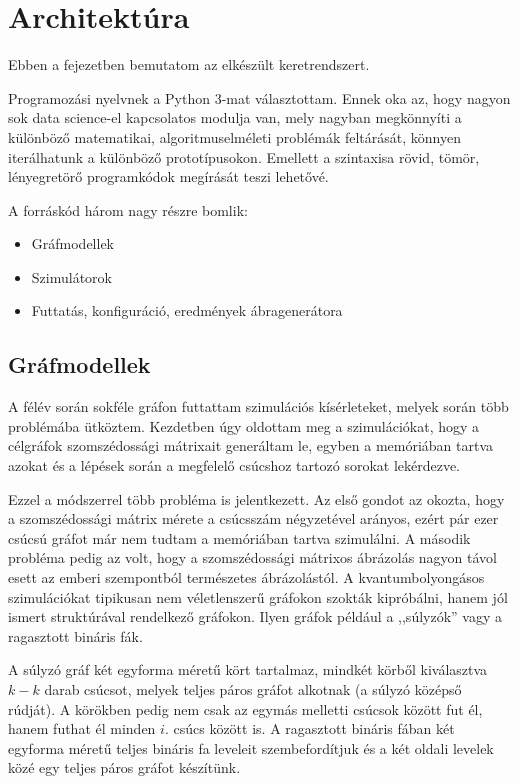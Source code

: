 \chapter{Architektúra}

Ebben a fejezetben bemutatom az elkészült keretrendszert.

Programozási nyelvnek a Python 3-mat választottam. Ennek oka az, hogy nagyon
sok data science-el kapcsolatos modulja van, mely nagyban megkönnyíti a
különböző matematikai, algoritmuselméleti problémák feltárását, könnyen
iterálhatunk a különböző prototípusokon. Emellett a szintaxisa rövid, tömör,
lényegretörő programkódok megírását teszi lehetővé.

A forráskód három nagy részre bomlik:
\begin{itemize}
  \item Gráfmodellek
  \item Szimulátorok
  \item Futtatás, konfiguráció, eredmények ábragenerátora
\end{itemize}

\section{Gráfmodellek}

A félév során sokféle gráfon futtattam szimulációs kísérleteket, melyek során
több problémába ütköztem. Kezdetben úgy oldottam meg a szimulációkat, hogy a
célgráfok szomszédossági mátrixait generáltam le, egyben a memóriában tartva
azokat és a lépések során a megfelelő csúcshoz tartozó sorokat lekérdezve.

Ezzel a módszerrel több probléma is jelentkezett. Az első gondot az okozta,
hogy a szomszédossági mátrix mérete a csúcsszám négyzetével arányos, ezért pár
ezer csúcsú gráfot már nem tudtam a memóriában tartva szimulálni. A második
probléma pedig az volt, hogy a szomszédossági mátrixos ábrázolás nagyon távol
esett az emberi szempontból természetes ábrázolástól. A kvantumbolyongásos
szimulációkat tipikusan nem véletlenszerű gráfokon szokták kipróbálni, hanem
jól ismert struktúrával rendelkező gráfokon. Ilyen gráfok például a ,,súlyzók''
vagy a ragasztott bináris fák.

A súlyzó gráf két egyforma méretű kört tartalmaz, mindkét körből kiválasztva
$k - k$ darab csúcsot, melyek teljes páros gráfot alkotnak (a súlyzó középső
rúdját). A körökben pedig nem csak az egymás melletti csúcsok között fut
él, hanem futhat él minden $i.$ csúcs között is. A ragasztott bináris fában
két egyforma méretű teljes bináris fa leveleit szembefordítjuk és a két
oldali levelek közé egy teljes páros gráfot készítünk.

